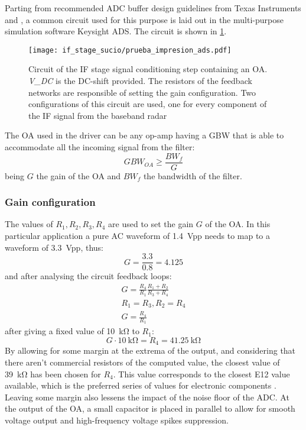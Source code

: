 Parting from recommended ADC buffer design guidelines from Texas Instruments \cite[p.~17]{TexasInstruments2022} and \cite{Franco2014}, a common circuit used for this purpose is laid out in the multi-purpose simulation software Keysight ADS. The circuit is shown in \cref{fig:if_cir}.

\begin{figure}[h]
	\centering
	\texttt{[image: if\_stage\_sucio/prueba\_impresion\_ads.pdf]} %
	\caption{Circuit of the IF stage signal conditioning step containing an OA. \textit{V\_DC} is the DC-shift provided. The resistors of the feedback networks are responsible of setting the gain configuration. Two configurations of this circuit are used, one for every component of the IF signal from the baseband radar}
	\label{fig:if_cir}
\end{figure}

The OA used in the driver can be any op-amp having a GBW that is able to accommodate all the incoming signal from the filter:
\begin{equation}
	GBW_{OA} \ge \frac{BW_{f}}{G}
\end{equation}
being $G$ the gain of the OA and $BW_{f}$ the bandwidth of the filter.


\subsubsection{Gain configuration}
The values of $R_1, R_2, R_3, R_4$ are used to set the gain $G$ of the OA.
In this particular application a pure AC waveform of \SI{1.4}{Vpp} needs to map to a waveform of \SI{3.3}{Vpp}, thus:
\begin{equation}
	G = \frac{3.3}{0.8} = 4.125 %
\end{equation}
and after analysing the circuit feedback loops:
\begin{gather}
	G = \frac{R_4}{R_1} \frac{R_1+R_2}{R_3+R_4}\\
	R_1 = R_3, R_2=R_4\\
	G= \frac{R_4}{R_1} %
\end{gather}
after giving a fixed value of \SI{10}{\kilo\ohm} to $R_1$:
\begin{equation}
	G \cdot \SI{10}{\kilo\ohm} = R_4 = \SI{41.25}{\kilo\ohm} %
\end{equation}
By allowing for some margin at the extrema of the output, and considering that there aren't commercial resistors of the computed value, the closest value of \SI{39}{\kilo\ohm} has been chosen for $R_4$. This value corresponds to the closest E12 value available, which is the preferred series of values for electronic components \cite{IEC2015}. Leaving some margin also lessens the impact of the noise floor of the ADC.
At the output of the OA, a small capacitor is placed in parallel to allow for smooth voltage output and high-frequency voltage spikes suppression.

